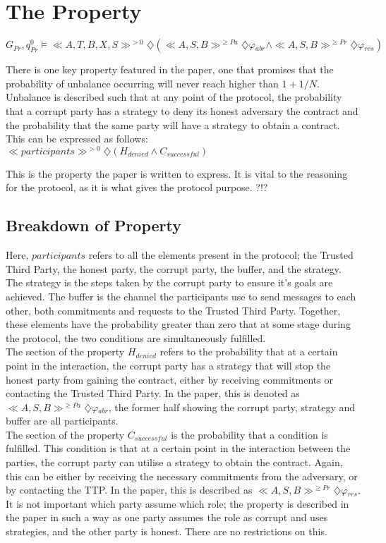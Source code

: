 \documentclass{l4proj}
\begin{document}
\section{The Property}

\centerline{$ G{_{Pr}},q_{Pr}^{0}\models  \ll A, T, B, X, S \gg ^{>0} \diamondsuit (\ll A, S, B \gg^{\ge Pa} \diamondsuit \varphi{_{abr}}  \wedge \ll A, S, B \gg^{\ge Pr} \diamondsuit \varphi{_{res}}) $}

There is one key property featured in the paper, one that promises that the probability of unbalance occurring will never reach higher than $1+1/N$. Unbalance is described such that at any point of the protocol, the probability that a corrupt party has a strategy to deny its honest adversary the contract and the probability that the same party will have a strategy to obtain a contract. This can be expressed as follows:\\
$\ll participants \gg ^{>0} \diamondsuit (H_{denied}  \wedge C_{successful}) $

This is the property the paper is written to express. It is vital to the reasoning for the protocol, as it is what gives the protocol purpose. ?!?
\subsection{Breakdown of Property}
Here, $participants$ refers to all the elements present in the protocol; the Trusted Third Party, the honest party, the corrupt party, the buffer, and the strategy. The strategy is the steps taken by the corrupt party to ensure it's goals are achieved. The buffer is the channel the participants use to send messages to each other, both commitments and requests to the Trusted Third Party. Together, these elements have the probability greater than zero that at some stage during the protocol, the two conditions are simultaneously fulfilled.\\
The section of the property $H_{denied}$ refers to the probability that at a certain point in the interaction, the corrupt party has a strategy that will stop the honest party from gaining the contract, either by receiving commitments or contacting the Trusted Third Party. In the paper, this is denoted as  $\ll A, S, B \gg^{\ge Pa} \diamondsuit \varphi{_{abr}}$, the former half showing the corrupt party, strategy and buffer are all participants. \\
The section of the property $C_{successful}$ is the probability that a condition is fulfilled. This condition is that at a certain point in the interaction between the parties, the corrupt party can utilise a strategy to obtain the contract. Again, this can be either by receiving the necessary commitments from the adversary, or by contacting the TTP. In the paper, this is described as $\ll A, S, B \gg^{\ge Pr} \diamondsuit \varphi{_{res}}$. \\
It is not important which party assume which role; the property is described in the paper in such a way as one party assumes the role as corrupt and uses strategies, and the other party is honest. There are no restrictions on this.
\end{document}
